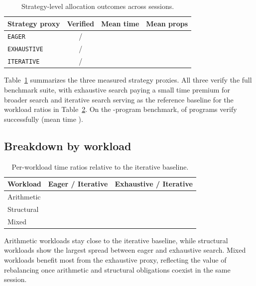\documentclass[11pt]{article}
\begin{document}
\begin{table}[h]
\centering
\caption{Strategy-level allocation outcomes across \numcases{} sessions.}
\label{tab:results}
\begin{tabular}{lccc}
\toprule
Strategy proxy & Verified & Mean time & Mean props \\
\midrule
\texttt{EAGER}      & \ppSixteenEagerVerified{}/\ppSixteenTotalPrograms{} & \ppSixteenEagerMeanTime{} & \ppSixteenEagerMeanProps{} \\
\texttt{EXHAUSTIVE} & \ppSixteenExhaustiveVerified{}/\ppSixteenTotalPrograms{} & \ppSixteenExhaustiveMeanTime{} & \ppSixteenExhaustiveMeanProps{} \\
\texttt{ITERATIVE}  & \ppSixteenIterativeVerified{}/\ppSixteenTotalPrograms{} & \ppSixteenIterativeMeanTime{} & \ppSixteenIterativeMeanProps{} \\
\bottomrule
\end{tabular}
\end{table}

Table~\ref{tab:results} summarizes the three measured strategy proxies.
All three verify the full benchmark suite, with exhaustive search paying a
small time premium for broader search and iterative search serving as the
reference baseline for the workload ratios in Table~\ref{tab:breakdown}.
On the \expTotalPrograms-program benchmark, \expAccuracy{} of programs verify
successfully (mean time \expTimeMean).

\subsection{Breakdown by workload}

\begin{table}[h]
\centering
\caption{Per-workload time ratios relative to the iterative baseline.}
\label{tab:breakdown}
\begin{tabular}{lcc}
\toprule
Workload & Eager / Iterative & Exhaustive / Iterative \\
\midrule
Arithmetic  & \ppSixteenArithFixedRatio{} & \ppSixteenArithAdaptiveRatio{} \\
Structural  & \ppSixteenStructFixedRatio{} & \ppSixteenStructAdaptiveRatio{} \\
Mixed       & \ppSixteenMixedFixedRatio{} & \ppSixteenMixedAdaptiveRatio{} \\
\bottomrule
\end{tabular}
\end{table}

Arithmetic workloads stay close to the iterative baseline, while structural
workloads show the largest spread between eager and exhaustive search.  Mixed
workloads benefit most from the exhaustive proxy, reflecting the value of
rebalancing once arithmetic and structural obligations coexist in the same
session.
\end{document}
